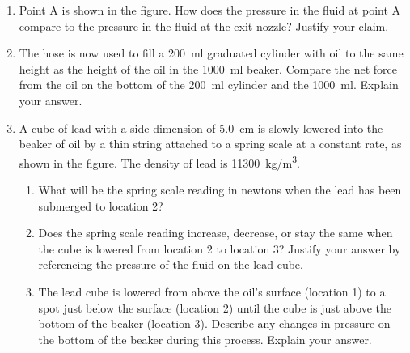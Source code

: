 \documentclass{../../../oss-apphys}
\begin{document}
\begin{enumerate}[leftmargin=15pt]
\begin{enumerate}[leftmargin=18pt]
  \item Point A is shown in the figure. How does the pressure in the fluid
    at point A compare to the pressure in the fluid at the exit nozzle?
    Justify your claim.
    \vspace{.75in}
    
  \item The hose is now used to fill a \SI{200}{\milli\litre} graduated
    cylinder with oil to the same height as the height of the oil in the
    \SI{1000}{\milli\litre} beaker. Compare the net force from the oil on the
    bottom of the \SI{200}{\milli\litre} cylinder and the
    \SI{1000}{\milli\litre}. Explain your answer.
    \vspace{1in}
    
  \item A cube of lead with a side dimension of \SI{5.0}{cm} is slowly lowered
    into the beaker of oil by a thin string attached to a spring scale at a
    constant rate, as shown in the figure. The density of lead is
    \SI{11300}{kg/m^3}.
    \begin{center}
    \end{center}
    \begin{enumerate}
    \item What will be the spring scale reading in newtons when the lead has
      been submerged to location 2?
    \item Does the spring scale reading increase, decrease, or stay the
      same when the cube is lowered from location 2 to location 3?
      Justify your answer by referencing the pressure of the fluid on
      the lead cube.
    \item The lead cube is lowered from above the oil’s surface (location
      1) to a spot just below the surface (location 2) until the cube is
      just above the bottom of the beaker (location 3). Describe any
      changes in pressure on the bottom of the beaker during this
      process. Explain your answer.
    \end{enumerate}
  \end{enumerate}
  \newpage
  

\end{enumerate}
\end{document}
